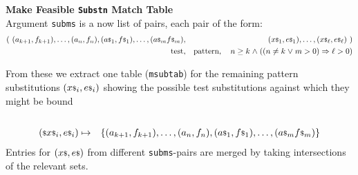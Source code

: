 \textbf{Make Feasible \texttt{Substn} Match Table}\\
  Argument \texttt{subms} is a now list of pairs, each pair of the form:
  \begin{eqnarray*}
   (~(a_{k+1},f_{k+1}),\ldots,(a_n,f_n), ({a}{\scriptstyle\$}_1,{f}{\scriptstyle\$}_1),\ldots,({a}{\scriptstyle\$}_m{f}{\scriptstyle\$}_m)
   &,&
     ({x}{\scriptstyle\$}_1,{e}{\scriptstyle\$}_1),\ldots,({x}{\scriptstyle\$}_\ell,{e}{\scriptstyle\$}_\ell)~)
  \\ \mbox{test}  &,& \mbox{pattern}, \quad n \geq k \mathrel{\wedge} ((n \neq k \mathrel{\vee} m > 0) \Rightarrow \ell > 0)
  \end{eqnarray*}

  From these we extract one table (\texttt{msubtab})
   for the remaining pattern substitutions  $({x}{\scriptstyle\$}_i,{e}{\scriptstyle\$}_i)$
  showing the possible test substitutions against which they might be bound
  \begin{eqnarray*}
  \\ {(}{\scriptstyle\$}{x}{\scriptstyle\$}_i,{e}{\scriptstyle\$}_i) &\mapsto&
    \{(a_{k+1},f_{k+1}),\ldots,(a_n,f_n), ({a}{\scriptstyle\$}_1,{f}{\scriptstyle\$}_1),\ldots,({a}{\scriptstyle\$}_m{f}{\scriptstyle\$}_m)\}
  \end{eqnarray*}
  Entries for $({x}{\scriptstyle\$},{e}{\scriptstyle\$})$
  from different \texttt{subms}-pairs
  are merged by taking intersections of the relevant sets.
  